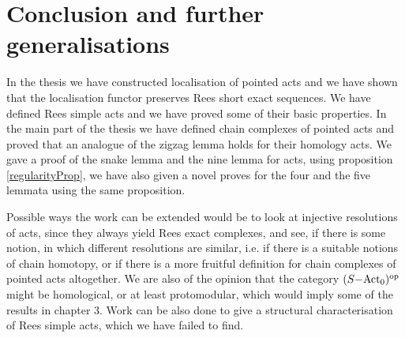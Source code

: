 \chapter*{Conclusion and further generalisations}

    In the thesis we have constructed localisation of pointed acts and we have shown that the localisation functor preserves Rees short exact sequences. We 
have defined Rees simple acts and we have proved some of their basic properties. In the main part of the thesis we have defined chain complexes of pointed acts and 
proved that an analogue of the zigzag lemma holds for their homology acts. We gave a proof of the snake lemma and the nine lemma for acts, using proposition \ref{regularityProp}, we have 
also given a novel proves for the four and the five lemmata using the same proposition. \par 
    Possible ways the work can be extended would be to look at injective resolutions of acts, since they always yield Rees exact complexes, and see, if there is some notion, in which 
different resolutions are similar, i.e. if there is a suitable notions of chain homotopy, or if there is a more fruitful definition for chain complexes of pointed acts altogether. We are also of the 
opinion that the category $(S\mathrm{-Act}_0)^{\mathrm{op}}$ might be homological, or at least protomodular, which would imply some of the results in chapter 3. Work can be also done to give a structural characterisation 
of Rees simple acts, which we have failed to find. 